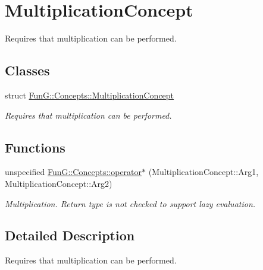 \hypertarget{group__MultiplicationConcept}{\section{Multiplication\-Concept}
\label{group__MultiplicationConcept}
}


Requires that multiplication can be performed.  


\subsection*{Classes}
\begin{DoxyCompactItemize}
\item 
struct \hyperlink{structFunG_1_1Concepts_1_1MultiplicationConcept}{Fun\-G\-::\-Concepts\-::\-Multiplication\-Concept}
\begin{DoxyCompactList}\small\item\em Requires that multiplication can be performed. \end{DoxyCompactList}\end{DoxyCompactItemize}
\subsection*{Functions}
\begin{DoxyCompactItemize}
\item 
\hypertarget{group__MultiplicationConcept_ga02a0c88d20771819afda900e6bbf16f5}{unspecified \hyperlink{group__MultiplicationConcept_ga02a0c88d20771819afda900e6bbf16f5}{Fun\-G\-::\-Concepts\-::operator$\ast$} (Multiplication\-Concept\-::\-Arg1, Multiplication\-Concept\-::\-Arg2)}\label{group__MultiplicationConcept_ga02a0c88d20771819afda900e6bbf16f5}

\begin{DoxyCompactList}\small\item\em Multiplication. Return type is not checked to support lazy evaluation. \end{DoxyCompactList}\end{DoxyCompactItemize}


\subsection{Detailed Description}
Requires that multiplication can be performed. 
